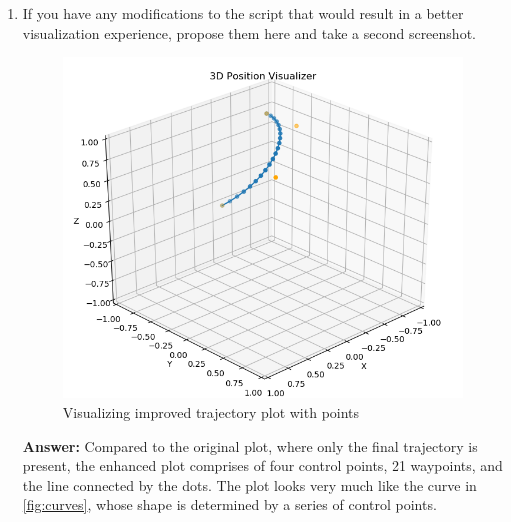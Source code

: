 \documentclass[12pt]{article}
\begin{document}
\begin{enumerate}
    \item If you have any modifications to the script that would result in a better visualization experience, propose them here and take a second screenshot.
    
    \begin{figure}[H]
        \vspace{-10pt}
        \centering\includegraphics[width=14cm]{images/plot_traj_mod.png}
        \caption{Visualizing improved trajectory plot with points}\label{fig:plot_traj_mod}
    \end{figure}

    \textbf{Answer: }Compared to the original plot, where only the final trajectory is present, the enhanced plot comprises of four control points, 21 waypoints, and the line connected by the dots. The plot looks very much like the curve in \ref{fig:curves}, whose shape is determined by a series of control points.

\end{enumerate}
    
    
\end{document}
